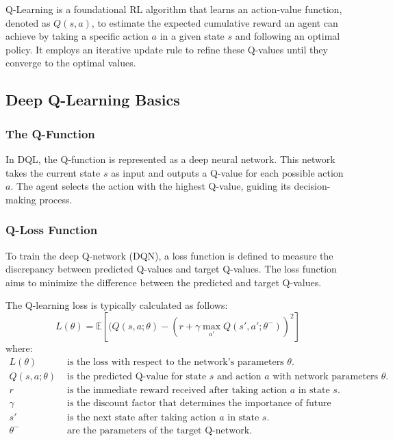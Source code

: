 \documentclass{scrartcl}
\begin{document}
Q-Learning is a foundational RL algorithm that learns an action-value function, denoted as $Q(s, a)$, to estimate the expected cumulative reward an agent can achieve by taking a specific action $a$ in a given state $s$ and following an optimal policy. It employs an iterative update rule to refine these Q-values until they converge to the optimal values.

\subsection{Deep Q-Learning Basics}

\subsubsection{The Q-Function}

In DQL, the Q-function is represented as a deep neural network. This network takes the current state $s$ as input and outputs a Q-value for each possible action $a$. The agent selects the action with the highest Q-value, guiding its decision-making process.

\subsubsection{Q-Loss Function}

To train the deep Q-network (DQN), a loss function is defined to measure the discrepancy between predicted Q-values and target Q-values. The loss function aims to minimize the difference between the predicted and target Q-values.

The Q-learning loss is typically calculated as follows:
\[
L(\theta) = \mathbb{E}\left[(Q(s, a;\theta) - (r + \gamma \max_{a'}Q(s', a';\theta^-))^2\right]
\]
where:
\begin{align*}
L(\theta) & \text{ is the loss with respect to the network's parameters }\theta. \\
Q(s, a;\theta) & \text{ is the predicted Q-value for state }s\text{ and action }a\text{ with network parameters }\theta. \\
r & \text{ is the immediate reward received after taking action }a\text{ in state }s. \\
\gamma & \text{ is the discount factor that determines the importance of future rewards.} \\
s' & \text{ is the next state after taking action }a\text{ in state }s. \\
\theta^- & \text{ are the parameters of the target Q-network.}
\end{align*}
\end{document}

